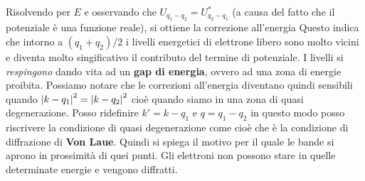 Risolvendo per $E$ e osservando che $U_{q_1-q_2} = U^*_{q_2-q_1}$ (a causa del fatto che il potenziale è una funzione reale), si ottiene la correzione all'energia
Questo indica che intorno a $(q_1+q_2)/2$ i livelli energetici di elettrone libero sono molto vicini e diventa molto singificativo il contributo del termine di potenziale. I livelli si \textit{respingono} dando vita ad un \textbf{gap di energia}, ovvero ad una zona di energie proibita. Possiamo notare che le correzioni all'energia diventano quindi sensibili quando $\abs{k-q_1} ^2 = \abs{k-q_2} ^2$ cioè quando siamo in una zona di quasi degenerazione. Posso ridefinire $k' =  k -  q_1$ e $q = q_1 - q_2$ in questo modo posso riscrivere la condizione di quasi degenerazione come
cioè 
che è la condizione di diffrazione di \textbf{Von Laue}. Quindi si spiega il motivo per il quale le bande si aprono in prossimità di quei punti. Gli elettroni non possono stare in quelle determinate energie e vengono diffratti.
